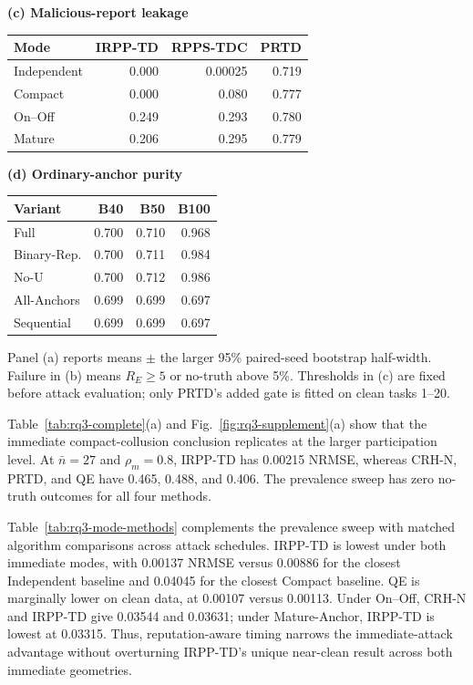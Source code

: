 \documentclass[journal]{IEEEtran}
\begin{document}
\begin{table}[!t]
\begin{minipage}[t]{0.31\textwidth}
\centering\textbf{(c) Malicious-report leakage}\par\vspace{0.35ex}
\setlength{\tabcolsep}{3.0pt}\begin{tabular}{lrrr}
\toprule Mode & IRPP-TD & RPPS-TDC & PRTD \\
\midrule Independent&0.000&0.00025&0.719\\ Compact&0.000&0.080&0.777\\ On--Off&0.249&0.293&0.780\\ Mature&0.206&0.295&0.779\\
\bottomrule\end{tabular}
\end{minipage}\hfill
\begin{minipage}[t]{0.31\textwidth}
\centering\textbf{(d) Ordinary-anchor purity}\par\vspace{0.35ex}
\setlength{\tabcolsep}{3.2pt}\begin{tabular}{lrrr}
\toprule Variant & B40 & B50 & B100 \\
\midrule Full&0.700&0.710&0.968\\ Binary-Rep.&0.700&0.711&0.984\\ No-U&0.700&0.712&0.986\\ All-Anchors&0.699&0.699&0.697\\ Sequential&0.699&0.699&0.697\\
\bottomrule\end{tabular}
\end{minipage}
\par\vspace{0.4ex}
\parbox{0.97\textwidth}{\scriptsize Panel (a) reports means $\pm$ the larger
95\% paired-seed bootstrap half-width. Failure in (b) means $R_E\geq5$ or
no-truth above 5\%. Thresholds in (c) are fixed before attack evaluation;
only PRTD's added gate is fitted on clean tasks 1--20.}
\end{table}

\newpage

Table~\ref{tab:rq3-complete}(a) and Fig.~\ref{fig:rq3-supplement}(a)
show that the immediate compact-collusion conclusion replicates at the larger
participation level. At $\bar n=27$ and
$\rho_m=0.8$, IRPP-TD has 0.00215 NRMSE, whereas CRH-N, PRTD, and QE have
0.465, 0.488, and 0.406. The prevalence sweep has zero no-truth outcomes for
all four methods.

Table~\ref{tab:rq3-mode-methods} complements the prevalence sweep with matched
algorithm comparisons across attack schedules. IRPP-TD is lowest under both
immediate modes, with 0.00137 NRMSE versus 0.00886 for the closest Independent
baseline and 0.04045 for the closest Compact baseline. QE is marginally lower
on clean data, at 0.00107 versus 0.00113. Under On--Off, CRH-N and IRPP-TD give
0.03544 and 0.03631; under Mature-Anchor, IRPP-TD is lowest at 0.03315.
Thus, reputation-aware timing narrows the immediate-attack advantage without
overturning IRPP-TD's unique near-clean result across both immediate geometries.
\end{document}
